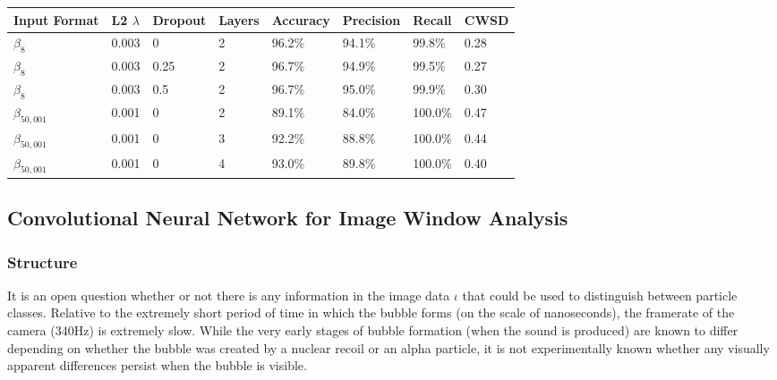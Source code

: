 \documentclass[10pt]{article}
\begin{document}
\begin{minipage}{\textwidth}
    \begin{center}
         \label{fft_wall_cuts}
        \begin{tabular}{|l|l|l|l|l|l|l|l|}
            \hline
            Input Format & L2 $\lambda$ & Dropout & Layers & Accuracy & Precision & Recall & CWSD \\
            \hline
            $\beta_8$ & 0.003 & 0 & 2 & 96.2\% & 94.1\% & 99.8\% & 0.28 \\
            \hline
            $\beta_8$ & 0.003 & 0.25 & 2 & 96.7\% & 94.9\% & 99.5\% & 0.27 \\
            \hline
            $\beta_8$ & 0.003 & 0.5 & 2 & 96.7\% & 95.0\% & 99.9\% & 0.30 \\
            \hline
            $\beta_{50,001}$ & 0.001 & 0 & 2 & 89.1\% & 84.0\% & 100.0\% & 0.47 \\
            \hline
            $\beta_{50,001}$ & 0.001 & 0 & 3 & 92.2\% & 88.8\% & 100.0\% & 0.44 \\
            \hline
            $\beta_{50,001}$ & 0.001 & 0 & 4 & 93.0\% & 89.8\% & 100.0\% & 0.40 \\
            \hline
        \end{tabular}
    \end{center}
\end{minipage}

\subsection{Convolutional Neural Network for Image Window Analysis}

\subsubsection{Structure}

It is an open question whether or not there is any information in the image data $\iota$ that could be used to distinguish between particle classes. Relative to the extremely short period of time in which the bubble forms (on the scale of nanoseconds), the framerate of the camera (340Hz) is extremely slow. While the very early stages of bubble formation (when the sound is produced) are known to differ depending on whether the bubble was created by a nuclear recoil or an alpha particle, it is not experimentally known whether any visually apparent differences persist when the bubble is visible.
\end{document}
